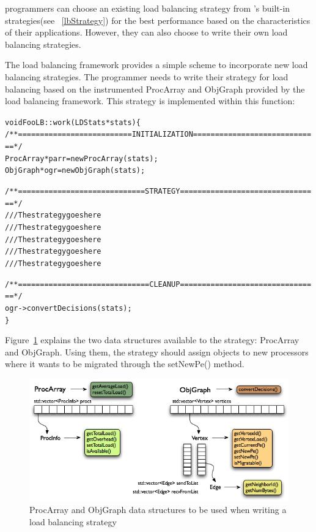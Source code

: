 \charmpp{} programmers can choose an existing load balancing strategy from
\charmpp{}'s built-in strategies(see ~\ref{lbStrategy}) for the best performance
based on the characteristics of their applications. However, they can also
choose to write their own load balancing strategies.

The \charmpp{} load balancing framework provides a simple scheme to incorporate
new load balancing strategies. The programmer needs to write their strategy for
load balancing based on the instrumented ProcArray and ObjGraph provided by the
load balancing framework. This strategy is implemented within this
function:

\begin{alltt}
void FooLB::work(LDStats *stats) \{
  /** ========================== INITIALIZATION ============================= */
  ProcArray *parr = new ProcArray(stats);
  ObjGraph *ogr = new ObjGraph(stats);

  /** ============================= STRATEGY ================================ */
  /// The strategy goes here
  /// The strategy goes here
  /// The strategy goes here
  /// The strategy goes here
  /// The strategy goes here

  /** ============================== CLEANUP ================================ */
  ogr->convertDecisions(stats);
\}
\end{alltt}

Figure~\ref{fig:ckgraph} explains the two data structures available to the
strategy: ProcArray and ObjGraph. Using them, the strategy should assign objects 
to new processors  where it wants to be migrated through the setNewPe() method.

\begin{figure}[h]
\centering
\includegraphics[width=6.0in]{fig/ckgraph.png}
\caption{ProcArray and ObjGraph data structures to be used when writing a load
balancing strategy}
\label{fig:ckgraph}
\end{figure}

